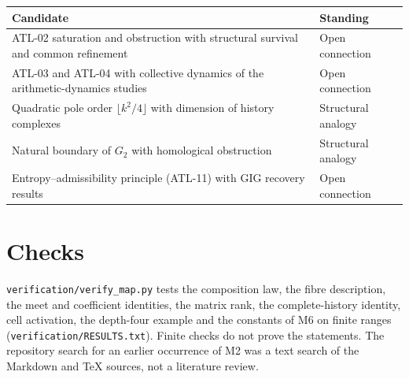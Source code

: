\documentclass[
  11pt,
]{article}
\begin{document}
\begin{longtable}[]{@{}ll@{}}
\toprule
\begin{minipage}[b]{0.64\columnwidth}\raggedright
Candidate\strut
\end{minipage} & \begin{minipage}[b]{0.30\columnwidth}\raggedright
Standing\strut
\end{minipage}\tabularnewline
\midrule
\endhead
\begin{minipage}[t]{0.64\columnwidth}\raggedright
ATL-02 saturation and obstruction with structural survival and common
refinement\strut
\end{minipage} & \begin{minipage}[t]{0.30\columnwidth}\raggedright
Open connection\strut
\end{minipage}\tabularnewline
\begin{minipage}[t]{0.64\columnwidth}\raggedright
ATL-03 and ATL-04 with collective dynamics of the arithmetic-dynamics
studies\strut
\end{minipage} & \begin{minipage}[t]{0.30\columnwidth}\raggedright
Open connection\strut
\end{minipage}\tabularnewline
\begin{minipage}[t]{0.64\columnwidth}\raggedright
Quadratic pole order \(\lfloor k^2/4\rfloor\) with dimension of history
complexes\strut
\end{minipage} & \begin{minipage}[t]{0.30\columnwidth}\raggedright
Structural analogy\strut
\end{minipage}\tabularnewline
\begin{minipage}[t]{0.64\columnwidth}\raggedright
Natural boundary of \(G_2\) with homological obstruction\strut
\end{minipage} & \begin{minipage}[t]{0.30\columnwidth}\raggedright
Structural analogy\strut
\end{minipage}\tabularnewline
\begin{minipage}[t]{0.64\columnwidth}\raggedright
Entropy--admissibility principle (ATL-11) with GIG recovery
results\strut
\end{minipage} & \begin{minipage}[t]{0.30\columnwidth}\raggedright
Open connection\strut
\end{minipage}\tabularnewline
\bottomrule
\end{longtable}

\hypertarget{checks}{%
\section{Checks}\label{checks}}

\texttt{verification/verify\_map.py} tests the composition law, the
fibre description, the meet and coefficient identities, the matrix rank,
the complete-history identity, cell activation, the depth-four example
and the constants of M6 on finite ranges
(\texttt{verification/RESULTS.txt}). Finite checks do not prove the
statements. The repository search for an earlier occurrence of M2 was a
text search of the Markdown and TeX sources, not a literature review.
\end{document}
